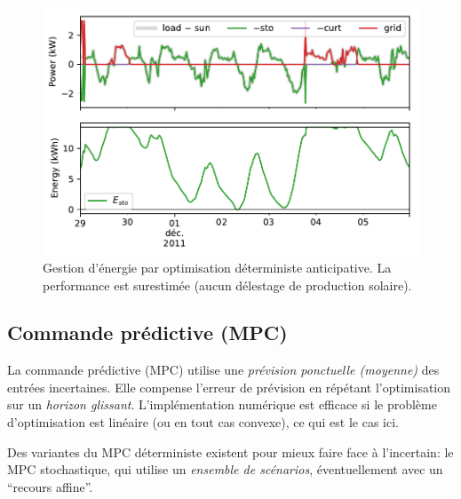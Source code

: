 \documentclass[a4paper,10pt,twocolumn]{article}
\begin{document}

\begin{figure}[!ht]
        \begin{center}
                \includegraphics[width=1\columnwidth]{figures/julia_anticipative.pdf}
        \end{center}

        \caption{Gestion d'énergie par optimisation déterministe anticipative. La performance est surestimée
        (aucun délestage de production solaire).
        }
        \label{fig:anticip}
\end{figure}

\subsection{Commande prédictive (MPC)}
La commande prédictive (MPC) utilise une \emph{prévision ponctuelle (moyenne)} des entrées incertaines.
Elle compense l'erreur de prévision en répétant l'optimisation sur un \emph{horizon glissant}.
L'implémentation numérique est efficace si le problème d'optimisation est linéaire (ou en tout cas convexe),
ce qui est le cas ici.

Des variantes du MPC déterministe existent pour mieux faire face à l'incertain: le MPC stochastique,
qui utilise un \emph{ensemble de scénarios}, éventuellement avec un ``recours affine''.


\end{document}
